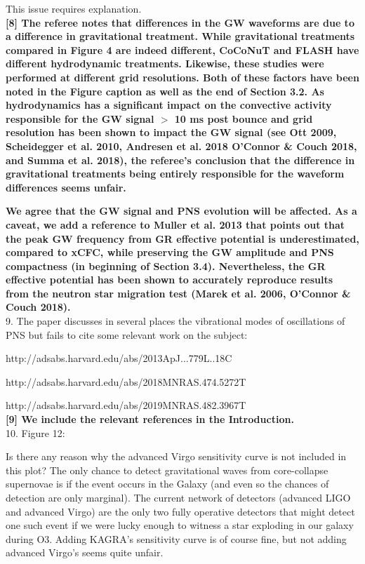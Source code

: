 \documentclass[11pt]{article}
\begin{document}
This issue requires explanation.\\

\textbf{[8] The referee notes that differences in the GW waveforms are due to a difference in gravitational treatment.  While gravitational treatments compared in Figure 4 are indeed different, CoCoNuT and FLASH have different hydrodynamic treatments.  Likewise, these studies were performed at different grid resolutions.  Both of these factors have been noted in the Figure caption as well as the end of Section 3.2.  As hydrodynamics has a significant impact on the convective activity responsible for the GW signal $>$ 10 ms post bounce and grid resolution has been shown to impact the GW signal (see Ott 2009, Scheidegger et al. 2010, Andresen et al. 2018 O'Connor \& Couch 2018, and Summa et al. 2018), the referee's conclusion that the difference in gravitational treatments being entirely responsible for the waveform differences seems unfair.}

\textbf{We agree that the GW signal and PNS evolution will be affected.  As a caveat, we add a reference to Muller et al. 2013 that points out that the peak GW frequency from GR effective potential is underestimated, compared to xCFC, while preserving the GW amplitude and PNS compactness (in beginning of Section 3.4).  Nevertheless, the GR effective potential has been shown to accurately reproduce results from the neutron star migration test (Marek et al. 2006, O'Connor \& Couch 2018).}\\

9. The paper discusses in several places the vibrational modes of oscillations of
PNS but fails to cite some relevant work on the subject:

http://adsabs.harvard.edu/abs/2013ApJ...779L..18C

http://adsabs.harvard.edu/abs/2018MNRAS.474.5272T

http://adsabs.harvard.edu/abs/2019MNRAS.482.3967T\\

\textbf{[9] We include the relevant references in the Introduction.}\\

10. Figure 12:

Is there any reason why the advanced Virgo sensitivity curve is not included in this plot? The only chance to detect gravitational waves from core-collapse supernovae is  if the event occurs in the Galaxy (and even so the chances of detection are only marginal). The current network of detectors (advanced LIGO and advanced Virgo) are the only two fully operative detectors that might detect one such event if we were lucky enough to witness a star exploding in our galaxy during O3. Adding KAGRA's sensitivity curve is of course fine, but not adding advanced Virgo's seems quite unfair.
\end{document}
